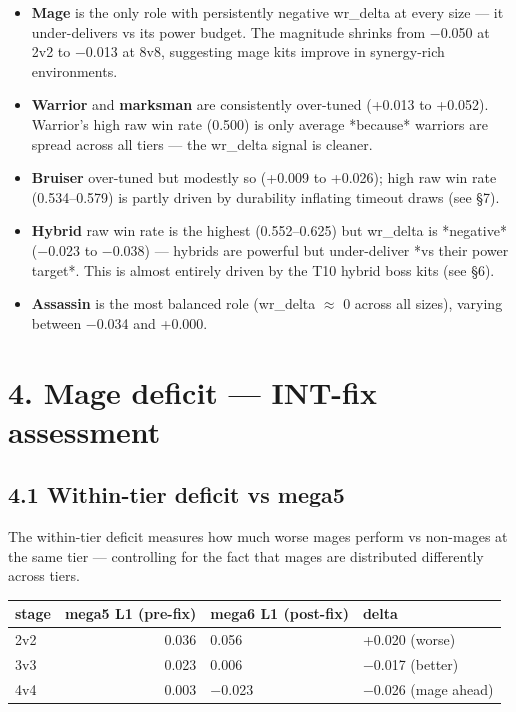 \documentclass[10pt]{article}
\begin{document}
\begin{itemize}
\item \textbf{Mage} is the only role with persistently negative wr\_delta at every size --- it under-delivers vs its power budget. The magnitude shrinks from −0.050 at 2v2 to −0.013 at 8v8, suggesting mage kits improve in synergy-rich environments.
\item \textbf{Warrior} and \textbf{marksman} are consistently over-tuned (+0.013 to +0.052). Warrior's high raw win rate (0.500) is only average *because* warriors are spread across all tiers --- the wr\_delta signal is cleaner.
\item \textbf{Bruiser} over-tuned but modestly so (+0.009 to +0.026); high raw win rate (0.534--0.579) is partly driven by durability inflating timeout draws (see \S{}7).
\item \textbf{Hybrid} raw win rate is the highest (0.552--0.625) but wr\_delta is *negative* (−0.023 to −0.038) --- hybrids are powerful but under-deliver *vs their power target*. This is almost entirely driven by the T10 hybrid boss kits (see \S{}6).
\item \textbf{Assassin} is the most balanced role (wr\_delta $\approx$ 0 across all sizes), varying between −0.034 and +0.000.
\end{itemize}


\section*{4. Mage deficit --- INT-fix assessment}

\subsection*{4.1 Within-tier deficit vs mega5}

The within-tier deficit measures how much worse mages perform vs non-mages at the same tier --- controlling for the fact that mages are distributed differently across tiers.\\

\medskip
\begin{tabularx}{\linewidth}{LrLL}
\toprule
\textbf{stage} & \textbf{mega5 L1 (pre-fix)} & \textbf{mega6 L1 (post-fix)} & \textbf{delta} \\
\midrule
2v2 & 0.036 & 0.056 & +0.020 (worse) \\
3v3 & 0.023 & 0.006 & −0.017 (better) \\
4v4 & 0.003 & −0.023 & −0.026 (mage ahead) \\
\bottomrule
\end{tabularx}
\medskip
\end{document}

